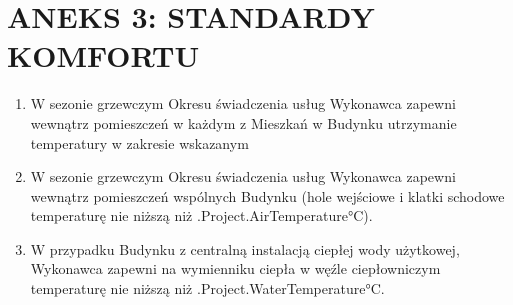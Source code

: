 \section{ANEKS 3: STANDARDY KOMFORTU}

\begin{enumerate}[label=\arabic*.]
	\item W sezonie grzewczym Okresu świadczenia usług Wykonawca zapewni wewnątrz pomieszczeń w każdym z Mieszkań w Budynku utrzymanie temperatury w zakresie wskazanym\@

	\item W sezonie grzewczym Okresu świadczenia usług Wykonawca zapewni wewnątrz pomieszczeń wspólnych Budynku (hole wejściowe i klatki schodowe temperaturę nie niższą niż \iffalse input project.airtemp value="{{.Project.AirTemperature}}" \fi {{.Project.AirTemperature}}°C).

	\item W przypadku Budynku z centralną instalacją ciepłej wody użytkowej, Wykonawca zapewni na wymienniku ciepła w węźle ciepłowniczym temperaturę nie niższą niż \iffalse input project.watertemp value="{{.Project.WaterTemperature}}" \fi {{.Project.WaterTemperature}}°C.
\end{enumerate}
